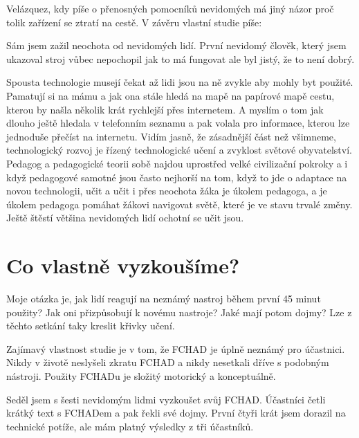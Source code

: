 Velázquez, kdy píše o přenosných pomocníků nevidomých má jiný názor proč tolik zařízení se ztratí na cestě.  V závěru vlastní studie píše:
\em
{}\em \citep[str. 15, přeložený z angičtiny]{velazquez2010wearable}%

Sám jsem zažil neochota od nevidomých lidí. První nevidomý člověk, který jsem ukazoval stroj vůbec nepochopil jak to má fungovat ale byl jistý, že to není dobrý.

Spousta technologie musejí čekat až lidi jsou na ně zvykle aby mohly byt použité.  Pamatují si na mámu a jak ona stále hledá na mapě na papírové mapě cestu, kterou by našla několik krát rychlejší přes internetem.  A myslím o tom jak dlouho ještě hledala v telefonním seznamu a pak volala pro informace, kterou lze jednoduše přečíst na internetu.  Vidím jasně, že zásadnější část než všimneme, technologický rozvoj je řízený technologické učení a zvyklost světové obyvatelství.  Pedagog a pedagogické teorii sobě najdou uprostřed velké civilizační pokroky a i když pedagogové samotné jsou často nejhorší na tom, když to jde o adaptace na novou technologii, učit a učit i přes neochota žáka je úkolem pedagoga, a je úkolem pedagoga pomáhat žákovi navigovat světě, které je ve stavu trvalé změny.  Ještě štěstí většina nevidomých lidí ochotní se učit jsou.

\section{Co vlastně vyzkoušíme?}

Moje otázka je, jak lidí reagují na neznámý nastroj během první 45 minut použity?  Jak oni přizpůsobují k novému nastroje?  Jaké mají potom dojmy?  Lze z těchto setkání taky kreslit křivky učení.

Zajímavý vlastnost studie je v tom, že FCHAD je úplně neznámý pro účastnici.  Nikdy v životě neslyšeli zkratu FCHAD a nikdy nesetkali dříve s podobným nástroji.  Použity FCHADu je složitý motorický a konceptuálně.

Seděl jsem s šesti nevidomým lidmi vyzkoušet svůj FCHAD. Účastníci četli krátký text s FCHADem a pak řekli své dojmy.  První čtyři krát jsem dorazil na technické potíže, ale mám platný výsledky z tři účastníků.
